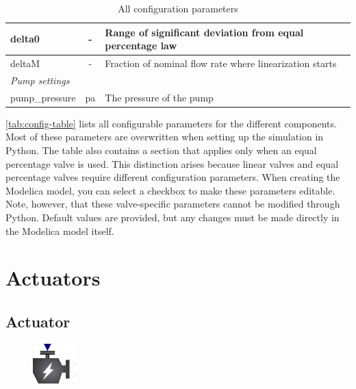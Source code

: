 \documentclass[we,final,11pt,oneside,openany]{uantwerpenbamathesis}
\begin{document}
\begin{table}[h!]
\begin{tabular}{|lcl|}
\multicolumn{1}{|l|}{delta0}                 & \multicolumn{1}{c|}{-}             & Range of significant deviation from equal percentage law \\ \hline
\multicolumn{1}{|l|}{deltaM}                 & \multicolumn{1}{c|}{-}             & Fraction of nominal flow rate where linearization starts \\ \hline
\multicolumn{3}{|l|}{\textit{Pump settings}}                                                                                                 \\ \hline
\multicolumn{1}{|l|}{pump\_pressure}         & \multicolumn{1}{c|}{pa}            & The pressure of the pump                                 \\ \hline
\end{tabular}
\caption{All configuration parameters}
\label{tab:config-table}
\end{table}

\newpage

\autoref{tab:config-table} lists all configurable parameters for the different components.
Most of these parameters are overwritten when setting up the simulation in Python.
The table also contains a section that applies only when an equal percentage valve is used.
This distinction arises because linear valves and equal percentage valves require different configuration parameters.
When creating the Modelica model, you can select a checkbox to make these parameters editable.
Note, however, that these valve-specific parameters cannot be modified through Python.
Default values are provided, but any changes must be made directly in the Modelica model itself.

\section{Actuators}
\label{sec:actuators}

\subsection{Actuator}
\label{subsec:actuators}

\begin{figure}
    \centering
    \includegraphics[width=0.15\textwidth]{Images/components/actuator}
\end{figure}
\end{document}
